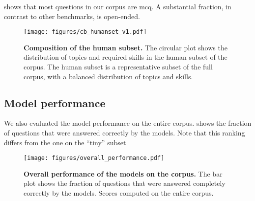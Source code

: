  shows that most questions in our corpus are \gls{mcq}.
A substantial fraction, in contrast to other benchmarks, is open-ended. 



\begin{figure}
    \centering
    \texttt{[image: figures/cb\_humanset\_v1.pdf]}
    \caption{\textbf{Composition of the human subset.} The circular plot shows the distribution of topics and required skills in the human subset of the \chembench corpus. The human subset is a representative subset of the full corpus, with a balanced distribution of topics and skills.}
\end{figure}

\subsection{Model performance}
We also evaluated the model performance on the entire \chembench corpus. 
 shows the fraction of questions that were answered correctly by the models. 
Note that this ranking differs from the one on the \enquote{tiny} subset

\begin{figure}[htb]
    \centering
    \texttt{[image: figures/overall\_performance.pdf]}
    \caption{\textbf{Overall performance of the models on the \chembench corpus.} The bar plot shows the fraction of questions that were answered completely correctly by the models. Scores computed on the entire \chembench corpus.}
    \label{fig:barplot_all_correct_all_questions}
\end{figure}

